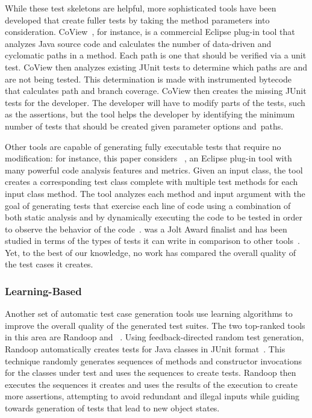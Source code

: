 While these test skeletons are helpful, more sophisticated tools have been
developed that create fuller tests by taking the method parameters into
consideration. CoView~\cite{CoView}, for instance, is a commercial Eclipse
plug-in tool that analyzes Java source code and calculates the number of
data-driven and cyclomatic paths in a method. Each path is one that should be
verified via a unit test. CoView then analyzes existing JUnit tests to determine
which paths are and are not being tested. This determination is made with
instrumented bytecode that calculates path and branch coverage. CoView then
creates the missing JUnit tests for the developer. The developer will have to
modify parts of the tests, such as the assertions, but the tool helps the
developer by identifying the minimum number of tests that should be created
given parameter options \mbox{and paths}.

Other tools are capable of generating fully executable tests that require no
modification: for instance, this paper considers \codepro~\cite{CodePro1}, an
Eclipse plug-in tool with many powerful code analysis features and metrics.
Given an input class, the tool creates a corresponding test class complete with
multiple test methods for each input class method. The tool analyzes each method
and input argument with the goal of generating tests that exercise each line of
code using a combination of both static analysis and by dynamically executing
the code to be tested in order to observe the behavior of the
code~\cite{CodePro2}.  \codepro was a Jolt Award finalist and has been studied
in terms of the types of tests it can write in comparison to other
tools~\cite{xie2009}.  Yet, to the best of our knowledge, no work has compared
the overall quality of the test cases it creates.

\subsubsection{Learning-Based}

Another set of automatic test case generation tools use learning algorithms to
improve the overall quality of the generated test suites.  The two top-ranked
tools in this area are Randoop and \evo~\cite{fraser2013a}.  Using
feedback-directed random test generation, Randoop automatically creates tests
for Java classes in JUnit format~\cite{pacheco2007feedback}. This technique
randomly generates sequences of methods and constructor invocations for the
classes under test and uses the sequences to create tests. Randoop then executes
the sequences it creates and uses the results of the execution to create more
assertions, attempting to  avoid redundant and illegal inputs while guiding
towards generation of tests that lead to new object states. 

